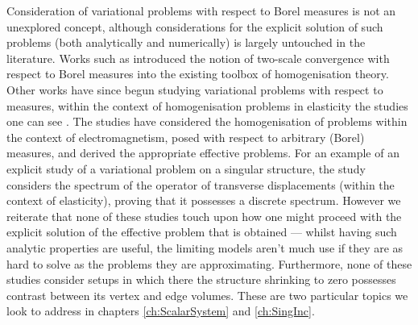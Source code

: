 Consideration of variational problems with respect to Borel measures is not an unexplored concept, although considerations for the explicit solution of such problems (both analytically and numerically) is largely untouched in the literature.
Works such as \cite{bouchitte2001homogenization, zhikov2000extension} introduced the notion of two-scale convergence with respect to Borel measures into the existing toolbox of homogenisation theory.
Other works have since begun studying variational problems with respect to measures, within the context of homogenisation problems in elasticity the studies one can see \cite{zhikov2002homogenization, zhikov2003homogenization, cherednichenko2019homogenisation}.
The studies \cite{cherednichenko2018operator, cherednichenko2022operator, cherednichenko2020order} have considered the homogenisation of problems within the context of electromagnetism, posed with respect to arbitrary (Borel) measures, and derived the appropriate effective problems.
For an example of an explicit study of a variational problem on a singular structure, the study \cite{zhikov2013spectrum} considers the spectrum of the operator of transverse displacements (within the context of elasticity), proving that it possesses a discrete spectrum.
However we reiterate that none of these studies touch upon how one might proceed with the explicit solution of the effective problem that is obtained --- whilst having such analytic properties are useful, the limiting models aren't much use if they are as hard to solve as the problems they are approximating.
Furthermore, none of these studies consider setups in which there the structure shrinking to zero possesses contrast between its vertex and edge volumes.
These are two particular topics we look to address in chapters \ref{ch:ScalarSystem} and \ref{ch:SingInc}.

